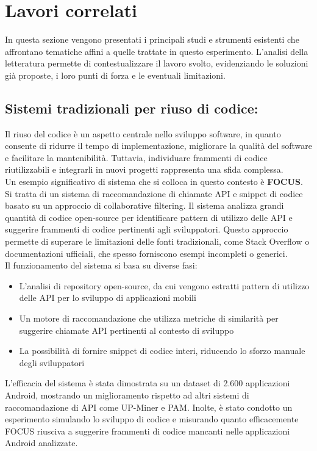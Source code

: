 \documentclass{article}
\begin{document}
\section{Lavori correlati}
In questa sezione vengono presentati i principali studi e strumenti esistenti che affrontano tematiche affini a quelle trattate in questo esperimento. L'analisi della letteratura permette di contestualizzare il lavoro svolto, evidenziando le soluzioni già proposte, i loro punti di forza e le eventuali limitazioni.

\subsection{Sistemi tradizionali per riuso di codice:}
Il riuso del codice è un aspetto centrale nello sviluppo software, in quanto consente di ridurre il tempo di implementazione, migliorare la qualità del software e facilitare la mantenibilità. Tuttavia, individuare frammenti di codice riutilizzabili e integrarli in nuovi progetti rappresenta una sfida complessa.\\
Un esempio significativo di sistema che si colloca in questo contesto è \textbf{FOCUS}\cite{nguyen2021recommending}. Si tratta di un sistema di raccomandazione di chiamate API e snippet di codice basato su un approccio di collaborative filtering. Il sistema analizza grandi quantità di codice open-source per identificare pattern di utilizzo delle API e suggerire frammenti di codice pertinenti agli sviluppatori. Questo approccio permette di superare le limitazioni delle fonti tradizionali, come Stack Overflow o documentazioni ufficiali, che spesso forniscono esempi incompleti o generici.\\
Il funzionamento del sistema si basa su diverse fasi:
\begin{itemize}
    \item L’analisi di repository open-source, da cui vengono estratti pattern di utilizzo delle API per lo sviluppo di applicazioni mobili
    \item Un motore di raccomandazione che utilizza metriche di similarità per suggerire chiamate API pertinenti al contesto di sviluppo
    \item La possibilità di fornire snippet di codice interi, riducendo lo sforzo manuale degli sviluppatori
\end{itemize}
L’efficacia del sistema è stata dimostrata su un dataset di 2.600 applicazioni Android, mostrando un miglioramento rispetto ad altri sistemi di raccomandazione di API come UP-Miner e PAM. Inolte, è stato condotto un esperimento simulando lo sviluppo di codice e misurando quanto efficacemente FOCUS riusciva a suggerire frammenti di codice mancanti nelle applicazioni Android analizzate.\\
\end{document}
